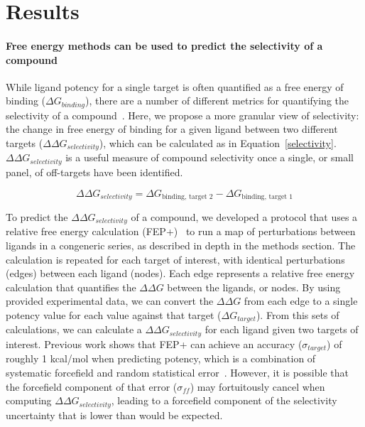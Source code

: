 \documentclass[9pt,lineno]{elife-modified} %
\begin{document}
%
%
%

\section{Results}
\paragraph{Free energy methods can be used to predict the selectivity of a compound}
While ligand potency for a single target is often quantified as a free energy of binding ($\Delta G_{binding}$), there are a number of different metrics for quantifying the selectivity of a compound~\citep{Bosc:2017gs,Cheng2010-ip}. Here, we propose a more granular view of selectivity: the change in free energy of binding for a given ligand between two different targets ($\Delta \Delta G_{selectivity}$), which can be calculated as in Equation~\ref{selectivity}. $\Delta \Delta G_{selectivity}$ is a useful measure of compound selectivity once a single, or small panel, of off-targets have been identified. 

\begin{equation}\label{selectivity}
\Delta \Delta G_{selectivity} = \Delta G_{\text{binding, target 2}} - \Delta G_{\text{binding, target 1}}
\end{equation}

To predict the $\Delta \Delta G_{selectivity}$ of a compound, we developed a protocol that uses a relative free energy calculation (FEP+)~\citep{Wang:J.Am.Chem.Soc.:2015} to run a map of perturbations between ligands in a congeneric series, as described in depth in the methods section. The calculation is repeated for each target of interest, with identical perturbations (edges) between each ligand (nodes). Each edge represents a relative free energy calculation that quantifies the $\Delta \Delta G$ between the ligands, or nodes. By using provided experimental data, we can convert the $\Delta \Delta G$ from each edge to a single potency value for each value against that target ($\Delta G_{target}$). From this sets of calculations, we can calculate a $\Delta \Delta G_{selectivity}$ for each ligand given two targets of interest. Previous work shows that FEP+ can achieve an accuracy ($\sigma_{target}$) of roughly 1 kcal/mol when predicting potency, which is a combination of systematic forcefield and random statistical error~\citep{Wang:J.Am.Chem.Soc.:2015}. However, it is possible that the forcefield component of that error ($\sigma_{ff}$) may fortuitously cancel when computing $\Delta \Delta G_{selectivity}$, leading to a forcefield component of the selectivity uncertainty that is lower than would be expected. 
\end{document}
